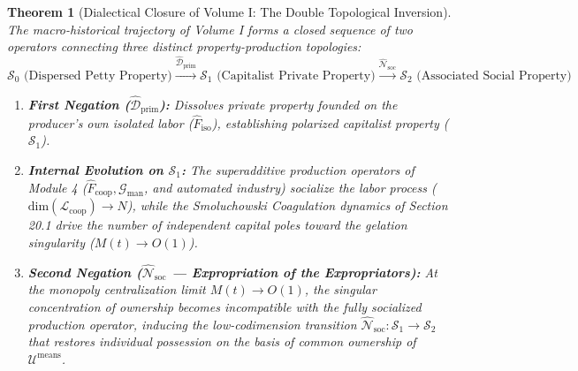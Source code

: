 \documentclass[11pt,a4paper]{article}
\newtheorem{theorem}{Theorem}[section]
\begin{document}
\begin{theorem}[Dialectical Closure of Volume I: The Double Topological Inversion]
The macro-historical trajectory of Volume I forms a closed sequence of two operators connecting three distinct property-production topologies:
\begin{equation}
    \mathcal{S}_0 \text{ (Dispersed Petty Property)} \xrightarrow{\hat{\mathcal{D}}_{\text{prim}}} \mathcal{S}_1 \text{ (Capitalist Private Property)} \xrightarrow{\hat{\mathcal{N}}_{\text{soc}}} \mathcal{S}_2 \text{ (Associated Social Property)}
\end{equation}
\begin{enumerate}[label=(\roman*)]
    \item \textbf{First Negation ($\hat{\mathcal{D}}_{\text{prim}}$):} Dissolves private property founded on the producer's own isolated labor ($\hat{F}_{\text{iso}}$), establishing polarized capitalist property ($\mathcal{S}_1$).
    \item \textbf{Internal Evolution on $\mathcal{S}_1$:} The superadditive production operators of Module 4 ($\hat{F}_{\text{coop}}, \mathcal{G}_{\text{man}}$, and automated industry) socialize the labor process ($\text{dim}(\mathcal{L}_{\text{coop}}) \to N$), while the Smoluchowski Coagulation dynamics of Section 20.1 drive the number of independent capital poles toward the gelation singularity ($M(t) \to O(1)$).
    \item \textbf{Second Negation ($\hat{\mathcal{N}}_{\text{soc}}$ --- Expropriation of the Expropriators):} At the monopoly centralization limit $M(t) \to O(1)$, the singular concentration of ownership becomes incompatible with the fully socialized production operator, inducing the low-codimension transition $\hat{\mathcal{N}}_{\text{soc}}: \mathcal{S}_1 \to \mathcal{S}_2$ that restores individual possession on the basis of common ownership of $\mathcal{U}^{\text{means}}$.
\end{enumerate}
\end{theorem}
\end{document}
